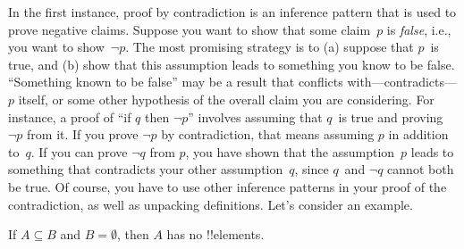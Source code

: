 \documentclass[../../../include/open-logic-section]{subfiles}
\begin{document}


In the first instance, proof by contradiction is an inference pattern
that is used to prove negative claims.  Suppose you want to show that
some claim~$p$ is \emph{false}, i.e., you want to show~$\lnot p$.  The
most promising strategy is to (a) suppose that $p$~is true, and (b)
show that this assumption leads to something you know to be false.
``Something known to be false'' may be a result that conflicts
with---contradicts---$p$ itself, or some other hypothesis of the
overall claim you are considering.  For instance, a proof of ``if $q$
then $\lnot p$'' involves assuming that $q$~is true and proving~$\lnot
p$ from it. If you prove $\lnot p$ by contradiction, that means
assuming $p$ in addition to~$q$. If you can prove $\lnot q$ from $p$,
you have shown that the assumption~$p$ leads to something that
contradicts your other assumption~$q$, since $q$~and $\lnot q$ cannot
both be true.  Of course, you have to use other inference patterns in
your proof of the contradiction, as well as unpacking definitions.
Let's consider an example.

\begin{prop}
  If $A \subseteq B$ and $B = \emptyset$, then $A$ has no !!{element}s.
\end{prop}
\end{document}
